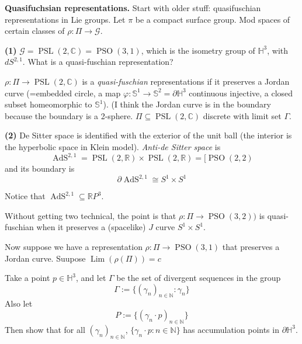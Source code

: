 \medskip\noindent
{\bf Quasifuchsian representations.}
Start with older stuff: quasifuschian
representations in Lie groups. Let $\pi$ be a
compact surface group. Mod spaces of certain
classes of $\rho:\Pi\longrightarrow
\mathcal{G}$.

{\bf (1)}
$\mathcal{G}=\operatorname{PSL}(2,
\mathbb{C})=\operatorname{PSO}(3,1)$,
which is the isometry group of
$\mathbb{H}^3$, with $dS^{2,1}$. What is a
quasi-fuschian representation?

\begin{definition}
\label{definition-smith-quasi-fuchsian}
$\rho:\Pi\longrightarrow
\operatorname{PSL}(2,\mathbb{C})$ is a
\textit{quasi-fuschian} representations if it
preserves a Jordan curve (=embedded circle, a
map $\varphi:\mathbb{S}^1\longrightarrow
\mathbb{S}^2=\partial \mathbb{H}^{3}$
continuous injective, a closed subset
homeomorphic to $\mathbb{S}^1$). (I think the
Jordan curve is in the boundary because the
boundary is a 2-sphere. $\Pi \subseteq
\operatorname{PSL}(2,\mathbb{C})$ discrete
with limit set $\Gamma$.
\end{definition}

{\bf (2)}
De Sitter space is identified with the
exterior of the unit ball (the interior is
the hyperbolic space in Klein model).
\textit{Anti-de Sitter space} is
$$\operatorname{AdS}^{2,1}=
\operatorname{PSL}(2,\mathbb{R})\times
\operatorname{PSL}(2,\mathbb{R})=
[\operatorname{PSO}(2,2)$$
and its boundary is
$$\partial \operatorname{AdS}^{2,1}\cong
S^1\times S^1$$

Notice that
$\operatorname{AdS}^{2,1}\subseteq
\mathbb{R}P^{3}$.

Without getting two technical, the point is
that $\rho:\Pi\longrightarrow
\operatorname{PSO}(3,2))$ is quasi-fuschian
when it preserves a (spacelike) $J$ curve
$S^1\times S^1$.

Now suppose we have a representation
$\rho:\Pi\longrightarrow
\operatorname{PSO}(3,1)$ that preserves a
Jordan curve. Suupose
$\operatorname{Lim}(\rho(\Pi))=c$

\begin{exercise}
\label{exercise-smith-limit-set}
Take a point $p \in\mathbb{H}^{3}$, and let
$\Gamma$ be the set of divergent sequences in
the group
$$\Gamma:=\{(\gamma_{n})_{ n
\in\mathbb{N}}:\gamma_n\}$$
Also let
$$P:=\{(\gamma_{n}\cdot p)_{n \in
\mathbb{N}}\}$$
Then show that for all $(\gamma_{n})_{n \in
\mathbb{N}}$, $\{\gamma_n\cdot p:n \in
\mathbb{N}\}$ has accumulation points in
$\partial \mathbb{H}^{3}$.
\end{exercise}

